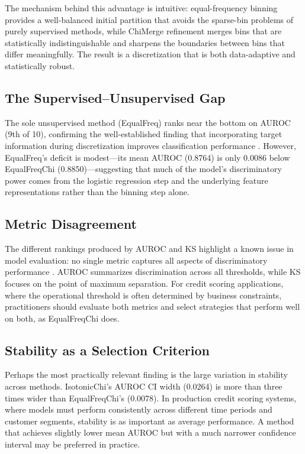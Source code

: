 \documentclass[11pt]{article}
\begin{document}
The mechanism behind this advantage is intuitive: equal-frequency binning provides a well-balanced initial partition that avoids the sparse-bin problems of purely supervised methods, while ChiMerge refinement merges bins that are statistically indistinguishable and sharpens the boundaries between bins that differ meaningfully. The result is a discretization that is both data-adaptive and statistically robust.

\subsection{The Supervised--Unsupervised Gap}

The sole unsupervised method (EqualFreq) ranks near the bottom on AUROC (9th of 10), confirming the well-established finding that incorporating target information during discretization improves classification performance \citep{dougherty1995supervised, garcia2013survey}. However, EqualFreq's deficit is modest---its mean AUROC (0.8764) is only 0.0086 below EqualFreqChi (0.8850)---suggesting that much of the model's discriminatory power comes from the logistic regression step and the underlying feature representations rather than the binning step alone.

\subsection{Metric Disagreement}

The different rankings produced by AUROC and KS highlight a known issue in model evaluation: no single metric captures all aspects of discriminatory performance \citep{hanley1982meaning}. AUROC summarizes discrimination across all thresholds, while KS focuses on the point of maximum separation. For credit scoring applications, where the operational threshold is often determined by business constraints, practitioners should evaluate both metrics and select strategies that perform well on both, as EqualFreqChi does.

\subsection{Stability as a Selection Criterion}

Perhaps the most practically relevant finding is the large variation in stability across methods. IsotonicChi's AUROC CI width (0.0264) is more than three times wider than EqualFreqChi's (0.0078). In production credit scoring systems, where models must perform consistently across different time periods and customer segments, stability is as important as average performance. A method that achieves slightly lower mean AUROC but with a much narrower confidence interval may be preferred in practice.
\end{document}

